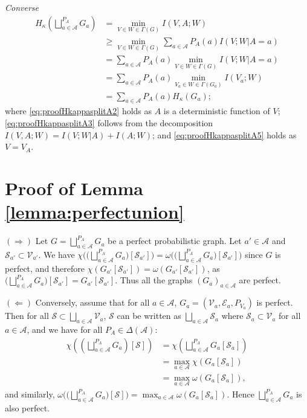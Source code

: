 \documentclass[conference,a4paper]{IEEEtran}
\begin{document}
\textit{Converse}
\begin{align}
    \!\!H_\kappa\left(\bigsqcup_{a \in \mathcal{A}}^{P_A} G_a \right) &  = \min_{V \in W \in \Gamma(G)} I(V,A;W) \label{eq:proofHkappasplitA2}\\
    & \geq \min_{V \in W \in \Gamma(G)} \sum_{a \in \mathcal{A}} P_A(a) I(V;W|A = a) \label{eq:proofHkappasplitA3}\\
    & = \sum_{a \in \mathcal{A}} P_A(a) \min_{V \in W \in \Gamma(G)} \! I(V;W|A = a) \label{eq:proofHkappasplitA4}\\
    & = \sum_{a \in \mathcal{A}} P_A(a) \min_{V_a \in W \in \Gamma(G_a)} I(V_a;W) \label{eq:proofHkappasplitA5}\\
    & = \sum_{a \in \mathcal{A}} P_A(a) H_\kappa(G_a); \label{eq:proofHkappasplitA6}
\end{align}
where \eqref{eq:proofHkappasplitA2} holds as $A$ is a deterministic function of $V$; \eqref{eq:proofHkappasplitA3} follows from the decomposition $I(V,A;W) = I(V;W|A) + I(A;W)$; and \eqref{eq:proofHkappasplitA5} holds as $V = V_A$.

\section{Proof of Lemma \ref{lemma:perfectunion}}\label{section:prooflemmaperfectunion}
$(\Longrightarrow)$ Let $G = \bigsqcup_{a \in \mathcal{A}}^{P_A} G_a$ be a perfect probabilistic graph. Let $a' \in \mathcal{A}$ and $\mathcal{S}_{a'} \subset \mathcal{V}_{a'}$. We have $\chi\big(\big(\bigsqcup_{a \in \mathcal{A}}^{P_A} G_a \big)[\mathcal{S}_{a'}]\big) = \omega\big(\big(\bigsqcup_{a \in \mathcal{A}}^{P_A} G_a \big)[\mathcal{S}_{a'}]\big)$ since $G$ is perfect, and therefore $\chi(G_{a'}[\mathcal{S}_{a'}]) = \omega(G_{a'}[\mathcal{S}_{a'}])$, as $\big(\bigsqcup_{a \in \mathcal{A}}^{P_A} G_a \big)[\mathcal{S}_{a'}] = G_{a'}[\mathcal{S}_{a'}]$. Thus all the graphs $(G_a)_{a \in \mathcal{A}}$ are perfect.

$(\Longleftarrow)$ Conversely, assume that for all $a \in \mathcal{A}$, $G_a = (\mathcal{V}_a, \mathcal{E}_a, P_{V_a})$ is perfect. Then for all $\mathcal{S} \subset \bigsqcup_{a \in \mathcal{A}} \mathcal{V}_a$, $\mathcal{S}$ can be written as $\bigsqcup_{a \in \mathcal{A}} \mathcal{S}_a$ where $\mathcal{S}_a \subset \mathcal{V}_a$ for all $a \in \mathcal{A}$, and we have for all $P_A \in \Delta(\mathcal{A})$:
\begin{align}
    \chi\left(\left(\bigsqcup_{a \in \mathcal{A}}^{P_A} G_a \right)[\mathcal{S}]\right) & = \chi\left(\bigsqcup_{a \in \mathcal{A}}^{P_A} G_a[\mathcal{S}_a] \right) \label{eq:proofmainperfectZ1}\\
    & = \max_{a \in \mathcal{A}} \chi\left(G_a[\mathcal{S}_a]\right) \label{eq:proofmainperfectZ2}\\
    & = \max_{a \in \mathcal{A}} \omega\left(G_a[\mathcal{S}_a]\right), \label{eq:proofmainperfectZ3}
\end{align}
and similarly, $\omega\big(\big(\bigsqcup_{a \in \mathcal{A}}^{P_A} G_a\big)[\mathcal{S}]\big) = \max_{a \in \mathcal{A}} \omega\left(G_a[\mathcal{S}_a]\right)$.
Hence $\bigsqcup_{a \in \mathcal{A}}^{P_A} G_a$ is also perfect.
\end{document}
